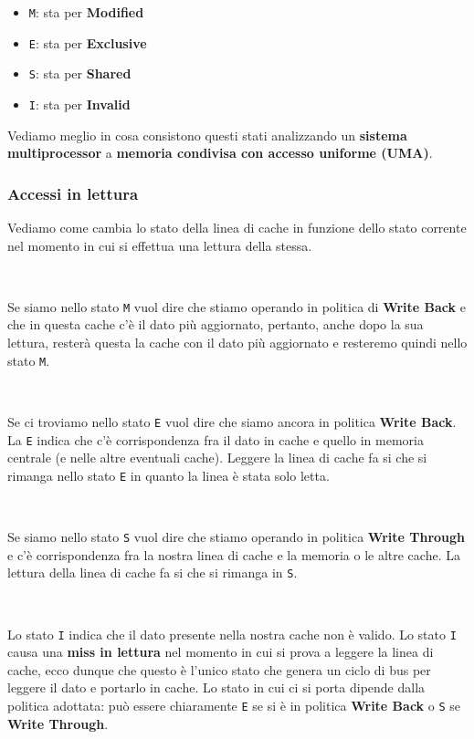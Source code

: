 \documentclass[11pt]{book}
\begin{document}
\begin{itemize}
\item \texttt{M}: sta per \textbf{Modified}
\item \texttt{E}: sta per \textbf{Exclusive}
\item \texttt{S}: sta per \textbf{Shared}
\item \texttt{I}: sta per \textbf{Invalid}
\end{itemize}

Vediamo meglio in cosa consistono questi stati analizzando un
\textbf{sistema multiprocessor} a \textbf{memoria condivisa con
  accesso uniforme (UMA)}.

\subsubsection*{Accessi in lettura}

Vediamo come cambia lo stato della linea di cache in funzione dello
stato corrente nel momento in cui si effettua una lettura della
stessa.

\

Se siamo nello stato \texttt{M} vuol dire che stiamo operando in
politica di \textbf{Write Back} e che in questa cache c'\`e il dato
pi\`u aggiornato, pertanto, anche dopo la sua lettura, rester\`a
questa la cache con il dato pi\`u aggiornato e resteremo quindi nello
stato \texttt{M}.

\

Se ci troviamo nello stato \texttt{E} vuol dire che siamo ancora in
politica \textbf{Write Back}. La \texttt{E} indica che c'\`e
corrispondenza fra il dato in cache e quello in memoria centrale (e
nelle altre eventuali cache). Leggere la linea di cache fa si che si
rimanga nello stato \texttt{E} in quanto la linea \`e stata solo
letta.

\

Se siamo nello stato \texttt{S} vuol dire che stiamo operando in
politica \textbf{Write Through} e c'\`e corrispondenza fra la nostra
linea di cache e la memoria o le altre cache. La lettura della linea
di cache fa si che si rimanga in \texttt{S}.

\

Lo stato \texttt{I} indica che il dato presente nella nostra cache non
\`e valido. Lo stato \texttt{I} causa una \textbf{miss in lettura} nel
momento in cui si prova a leggere la linea di cache, ecco dunque che
questo \`e l'unico stato che genera un ciclo di bus per leggere il
dato e portarlo in cache. Lo stato in cui ci si porta dipende dalla
politica adottata: pu\`o essere chiaramente \texttt{E} se si \`e in
politica \textbf{Write Back} o \texttt{S} se \textbf{Write Through}.
\end{document}
